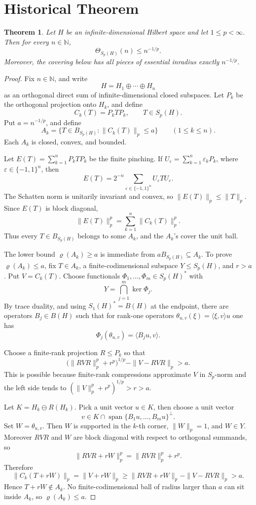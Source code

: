 \documentclass[11pt]{article}
\newtheorem{theorem}{Theorem}
\newcommand{\N}{\mathbb N}
\newcommand{\Span}{\operatorname{span}}
\begin{document}
\section*{Historical Theorem}

\begin{theorem}
Let \(H\) be an infinite-dimensional Hilbert space and let
\(1\le p<\infty\).  Then for every \(n\in\N\),
\[
  \Theta_{S_p(H)}(n)\le n^{-1/p}.
\]
Moreover, the covering below has all pieces of essential inradius exactly
\(n^{-1/p}\).
\end{theorem}

\begin{proof}
Fix \(n\in\N\), and write
\[
  H=H_1\oplus\cdots\oplus H_n
\]
as an orthogonal direct sum of infinite-dimensional closed subspaces.  Let
\(P_k\) be the orthogonal projection onto \(H_k\), and define
\[
  C_k(T)=P_kTP_k,\qquad T\in S_p(H).
\]
Put \(a=n^{-1/p}\), and define
\[
  A_k=\{T\in B_{S_p(H)}:\|C_k(T)\|_p\le a\}\qquad(1\le k\le n).
\]
Each \(A_k\) is closed, convex, and bounded.

Let \(E(T)=\sum_{k=1}^nP_kTP_k\) be the finite pinching.  If
\(U_\varepsilon=\sum_{k=1}^n\varepsilon_kP_k\), where
\(\varepsilon\in\{-1,1\}^n\), then
\[
  E(T)=2^{-n}\sum_{\varepsilon\in\{-1,1\}^n}
  U_\varepsilon T U_\varepsilon.
\]
The Schatten norm is unitarily invariant and convex, so
\(\|E(T)\|_p\le\|T\|_p\).  Since \(E(T)\) is block diagonal,
\[
  \|E(T)\|_p^p=\sum_{k=1}^n\|C_k(T)\|_p^p.
\]
Thus every \(T\in B_{S_p(H)}\) belongs to some \(A_k\), and the \(A_k\)'s
cover the unit ball.

The lower bound \(\varrho(A_k)\ge a\) is immediate from
\(aB_{S_p(H)}\subseteq A_k\).  To prove \(\varrho(A_k)\le a\), fix
\(T\in A_k\), a finite-codimensional subspace \(Y\le S_p(H)\), and
\(r>a\).  Put \(V=C_k(T)\).  Choose functionals
\(\Phi_1,\dots,\Phi_m\in S_p(H)^*\) with
\[
  Y=\bigcap_{j=1}^m\ker\Phi_j.
\]
By trace duality, and using \(S_1(H)^*=B(H)\) at the endpoint, there are
operators \(B_j\in B(H)\) such that for rank-one operators
\(\theta_{u,v}(\xi)=\langle\xi,v\rangle u\) one has
\[
  \Phi_j(\theta_{u,v})=\langle B_ju,v\rangle.
\]

Choose a finite-rank projection \(R\le P_k\) so that
\[
  \bigl(\|RVR\|_p^p+r^p\bigr)^{1/p}-\|V-RVR\|_p>a.
\]
This is possible because finite-rank compressions approximate \(V\) in
\(S_p\)-norm and the left side tends to
\((\|V\|_p^p+r^p)^{1/p}>r>a\).

Let \(K=H_k\ominus R(H_k)\).  Pick a unit vector \(u\in K\), then choose a
unit vector
\[
  v\in K\cap \Span\{B_1u,\dots,B_mu\}^{\perp}.
\]
Set \(W=\theta_{u,v}\).  Then \(W\) is supported in the \(k\)-th corner,
\(\|W\|_p=1\), and \(W\in Y\).  Moreover \(RVR\) and \(W\) are block
diagonal with respect to orthogonal summands, so
\[
  \|RVR+rW\|_p^p=\|RVR\|_p^p+r^p.
\]
Therefore
\[
  \|C_k(T+rW)\|_p=\|V+rW\|_p
  \ge \|RVR+rW\|_p-\|V-RVR\|_p>a.
\]
Hence \(T+rW\notin A_k\).  No finite-codimensional ball of radius larger
than \(a\) can sit inside \(A_k\), so \(\varrho(A_k)\le a\).
\end{proof}
\end{document}
